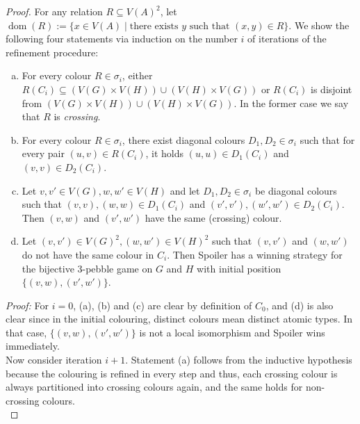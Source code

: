 \documentclass[10pt,a4paper]{article}
\newcommand{\lra}{\longrightarrow}
\newcommand{\dom}{\operatorname{dom}}
\begin{document}
\begin{proof}
			For any relation $R \subseteq V(A)^2$, let $\dom(R) := \{x \in V(A) \mid \text{there exists } y \text{ such that }(x,y) \in R \}$. We show the following four statements via induction on the number $i$ of iterations of the refinement procedure:
			\begin{enumerate}[(a)]
				\item For every colour $R \in \sigma_i$, either $R(C_i) \subseteq (V(G) \times V(H)) \cup (V(H) \times V(G))$ or $R(C_i)$ is disjoint from $(V(G) \times V(H)) \cup (V(H) \times V(G))$. In the former case we say that $R$ is \emph{crossing}.
				\item For every colour $R \in \sigma_i$, there exist diagonal colours $D_1,D_2 \in \sigma_i$ such that for every pair $(u,v) \in R(C_i)$, it holds $(u,u) \in D_1(C_i)$ and $(v,v) \in D_2(C_i)$.
				\item Let $v,v' \in V(G), w,w' \in V(H)$ and let $D_1,D_2 \in \sigma_i$ be diagonal colours such that $(v,v), (w,w) \in D_1(C_i)$ and $(v',v'), (w',w') \in D_2(C_i)$. Then $(v,w)$ and $(v',w')$ have the same (crossing) colour.
				\item Let $(v,v') \in V(G)^2, (w,w') \in V(H)^2$ such that $(v,v')$ and $(w,w')$ do not have the same colour in $C_i$. Then Spoiler has a winning strategy for the bijective 3-pebble game on $G$ and $H$ with initial position $\{(v,w),(v',w')\}$.
			\end{enumerate}	 
		
			\textit{Proof:} For $i=0$, (a), (b) and (c) are clear by definition of $C_0$, and (d) is also clear since in the initial colouring, distinct colours mean distinct atomic types. In that case, $\{(v,w),(v',w')\}$ is not a local isomorphism and Spoiler wins immediately.\\
			
			Now consider iteration $i+1$. Statement (a) follows from the inductive hypothesis because the colouring is refined in every step and thus, each crossing colour is always partitioned into crossing colours again, and the same holds for non-crossing colours.\\
			

\end{proof}
\end{document}
